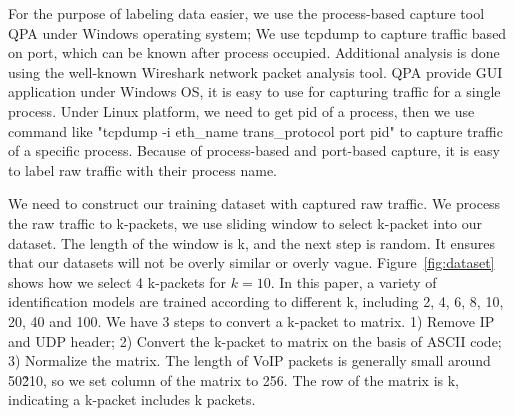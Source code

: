 \documentclass[conference]{IEEEtran}
\begin{document}

For the purpose of labeling data easier, we use the process-based capture tool QPA under Windows operating system; We use tcpdump to capture traffic based on port, which can be known after process occupied. Additional analysis is done using the well-known Wireshark network packet analysis tool. QPA provide GUI application under Windows OS, it is easy to use for capturing traffic for a single process. Under Linux platform, we need to get pid of a process, then we use command like "tcpdump -i eth\_name trans\_protocol port pid" to capture traffic of a specific process. Because of process-based and port-based capture, it is easy to label raw traffic with their process name.

We need to construct our training dataset with captured raw traffic. We process the raw traffic to k-packets, we use sliding window to select k-packet into our dataset. The length of the window is k, and the next step is random. It ensures that our datasets will not be overly similar or overly vague. Figure~\ref{fig:dataset} shows how we select 4 k-packets for $k=10$. In this paper, a variety of identification models are trained according to different k, including 2, 4, 6, 8, 10, 20, 40 and 100. We have 3 steps to convert a k-packet to matrix. 1) Remove IP and UDP header; 2) Convert the k-packet to matrix on the basis of ASCII code; 3) Normalize the matrix. The length of VoIP packets is generally small around 50\~210, so we set column of the matrix to 256. The row of the matrix is k, indicating a k-packet includes k packets.
\end{document}
